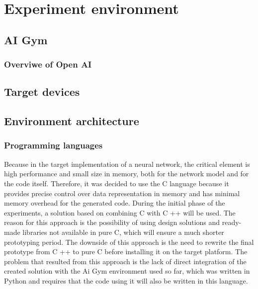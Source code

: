 \FloatBarrier
\chapter{Experiment environment}

\FloatBarrier
\section{AI Gym}

\FloatBarrier
\subsection{Overviwe of Open AI}


\FloatBarrier
\section{Target devices}

\FloatBarrier
\section{Environment architecture}

\FloatBarrier
\subsection{Programming languages}
Because in the target implementation of a neural network, the critical element is high 
performance and small size in memory, both for the network model and for the code itself.
Therefore, it was decided to use the C language because it provides precise control over data 
representation in memory and has minimal memory overhead for the generated code. 
During the initial phase of the experiments, a solution based on combining C with C ++ will be
used. 
The reason for this approach is the possibility of using design solutions and ready-made
libraries not available in pure C, which will ensure a much shorter prototyping period. 
The downside of this approach is the need to rewrite the final prototype from C ++ to pure C 
before installing it on the target platform.
The problem that resulted from this approach is the lack of direct integration of the created
solution with the Ai Gym environment used so far, which was written in Python and requires that 
the code using it will also be written in this language.

